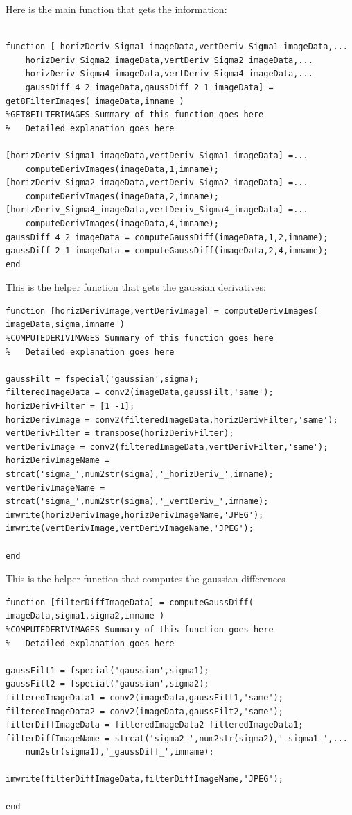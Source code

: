 \documentclass[11pt,psfig]{article}
\begin{document}
Here is the main function that gets the information:

\begin{verbatim}

function [ horizDeriv_Sigma1_imageData,vertDeriv_Sigma1_imageData,...
    horizDeriv_Sigma2_imageData,vertDeriv_Sigma2_imageData,...
    horizDeriv_Sigma4_imageData,vertDeriv_Sigma4_imageData,...
    gaussDiff_4_2_imageData,gaussDiff_2_1_imageData] = get8FilterImages( imageData,imname )
%GET8FILTERIMAGES Summary of this function goes here
%   Detailed explanation goes here

[horizDeriv_Sigma1_imageData,vertDeriv_Sigma1_imageData] =...
    computeDerivImages(imageData,1,imname);
[horizDeriv_Sigma2_imageData,vertDeriv_Sigma2_imageData] =...
    computeDerivImages(imageData,2,imname);
[horizDeriv_Sigma4_imageData,vertDeriv_Sigma4_imageData] =...
    computeDerivImages(imageData,4,imname);
gaussDiff_4_2_imageData = computeGaussDiff(imageData,1,2,imname);
gaussDiff_2_1_imageData = computeGaussDiff(imageData,2,4,imname);
end

\end{verbatim}

This is the helper function that gets the gaussian derivatives:

\begin{verbatim}
function [horizDerivImage,vertDerivImage] = computeDerivImages( imageData,sigma,imname )
%COMPUTEDERIVIMAGES Summary of this function goes here
%   Detailed explanation goes here

gaussFilt = fspecial('gaussian',sigma);
filteredImageData = conv2(imageData,gaussFilt,'same');
horizDerivFilter = [1 -1];
horizDerivImage = conv2(filteredImageData,horizDerivFilter,'same');
vertDerivFilter = transpose(horizDerivFilter);
vertDerivImage = conv2(filteredImageData,vertDerivFilter,'same');
horizDerivImageName = strcat('sigma_',num2str(sigma),'_horizDeriv_',imname);
vertDerivImageName = strcat('sigma_',num2str(sigma),'_vertDeriv_',imname);
imwrite(horizDerivImage,horizDerivImageName,'JPEG');
imwrite(vertDerivImage,vertDerivImageName,'JPEG');

end
\end{verbatim}

This is the helper function that computes the gaussian differences

\begin{verbatim}
function [filterDiffImageData] = computeGaussDiff( imageData,sigma1,sigma2,imname )
%COMPUTEDERIVIMAGES Summary of this function goes here
%   Detailed explanation goes here

gaussFilt1 = fspecial('gaussian',sigma1);
gaussFilt2 = fspecial('gaussian',sigma2);
filteredImageData1 = conv2(imageData,gaussFilt1,'same');
filteredImageData2 = conv2(imageData,gaussFilt2,'same');
filterDiffImageData = filteredImageData2-filteredImageData1;
filterDiffImageName = strcat('sigma2_',num2str(sigma2),'_sigma1_',...
    num2str(sigma1),'_gaussDiff_',imname);

imwrite(filterDiffImageData,filterDiffImageName,'JPEG');

end
\end{verbatim}
\end{document}
